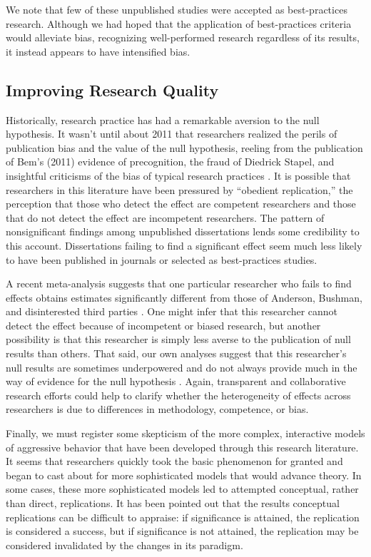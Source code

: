 \documentclass[man]{apa6}
\begin{document}
We note that few of these unpublished studies were accepted as best-practices research. Although we had hoped that the application of best-practices criteria would alleviate bias, recognizing well-performed research regardless of its results, it instead appears to have intensified bias. 

\subsection{Improving Research Quality}
Historically, research practice has had a remarkable aversion to the null hypothesis. It wasn't until about 2011 that researchers realized the perils of publication bias and the value of the null hypothesis, reeling from the publication of Bem's (2011) \nocite{Bem:2011} evidence of precognition, the fraud of Diedrick Stapel, and insightful criticisms of the bias of typical research practices \citep{Bakker:etal:2011,Ioannidis:2011,Simmons:etal:2011,Bones:20xx}. It is possible that researchers in this literature have been pressured by ``obedient replication,'' the perception that those who detect the effect are competent researchers and those that do not detect the effect are incompetent researchers. The pattern of nonsignificant findings among unpublished dissertations lends some credibility to this account. Dissertations failing to find a significant effect seem much less likely to have been published in journals or selected as best-practices studies. 

A recent meta-analysis suggests that one particular researcher who fails to find effects obtains estimates significantly different from those of Anderson, Bushman, and disinterested third parties \citep{Greitemeyer:Mugge:2014}. One might infer that this researcher cannot detect the effect because of incompetent or biased research, but another possibility is that this researcher is simply less averse to the publication of null results than others. That said, our own analyses suggest that this researcher's null results are sometimes underpowered and do not always provide much in the way of evidence for the null hypothesis \citep{Hilgard:etal:2015}. Again, transparent and collaborative research efforts could help to clarify whether the heterogeneity of effects across researchers is due to differences in methodology, competence, or bias.

Finally, we must register some skepticism of the more complex, interactive models of aggressive behavior that have been developed through this research literature. It seems that researchers quickly took the basic phenomenon for granted and began to cast about for more sophisticated models that would advance theory. In some cases, these more sophisticated models led to attempted conceptual, rather than direct, replications. It has been pointed out that the results conceptual replications can be difficult to appraise: if significance is attained, the replication is considered a success, but if significance is not attained, the replication may be considered invalidated by the changes in its paradigm. 
\end{document}
